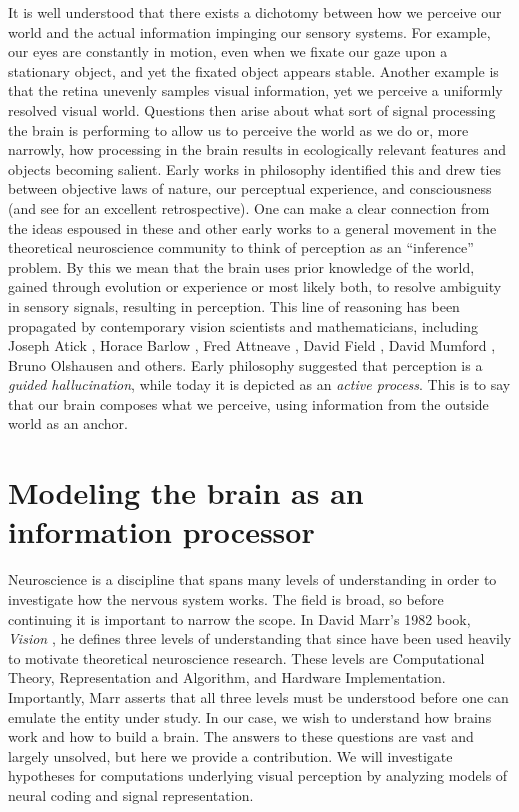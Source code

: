 It is well understood that there exists a dichotomy between how we perceive our world and the actual information impinging our sensory systems. For example, our eyes are constantly in motion, even when we fixate our gaze upon a stationary object, and yet the fixated object appears stable. Another example is that the retina unevenly samples visual information, yet we perceive a uniformly resolved visual world. Questions then arise about what sort of signal processing the brain is performing to allow us to perceive the world as we do or, more narrowly, how processing in the brain results in ecologically relevant features and objects becoming salient. Early works in philosophy identified this and drew ties between objective laws of nature, our perceptual experience, and consciousness \parencite{kant1790critique, helmholtz1878facts} (and see \parencite{westheimer2008helmholtz} for an excellent retrospective). One can make a clear connection from the ideas espoused in these and other early works to a general movement in the theoretical neuroscience community to think of perception as an ``inference'' problem. By this we mean that the brain uses prior knowledge of the world, gained through evolution or experience or most likely both, to resolve ambiguity in sensory signals, resulting in perception. This line of reasoning has been propagated by contemporary vision scientists and mathematicians, including Joseph Atick \citeyearpar{atick1990towards}, Horace Barlow \citeyearpar{barlow2001redundancy}, Fred Attneave \citeyearpar{attneave1954some}, David Field \citeyearpar{field1994goal}, David Mumford \citeyearpar{mumford1994pattern}, Bruno Olshausen \citeyearpar{olshausen2013perception} and others. Early philosophy suggested that perception is a \textit{guided hallucination}, while today it is depicted as an \textit{active process}. This is to say that our brain composes what we perceive, using information from the outside world as an anchor.


\section{Modeling the brain as an information processor}
Neuroscience is a discipline that spans many levels of understanding in order to investigate how the nervous system works. The field is broad, so before continuing it is important to narrow the scope. In David Marr's 1982 book, \textit{Vision} \citeyearpar{marr1982vision}, he defines three levels of understanding that since have been used heavily to motivate theoretical neuroscience research. These levels are Computational Theory, Representation and Algorithm, and Hardware Implementation. Importantly, Marr asserts that all three levels must be understood before one can emulate the entity under study. In our case, we wish to understand how brains work and how to build a brain. The answers to these questions are vast and largely unsolved, but here we provide a contribution. We will investigate hypotheses for computations underlying visual perception by analyzing models of neural coding and signal representation.

